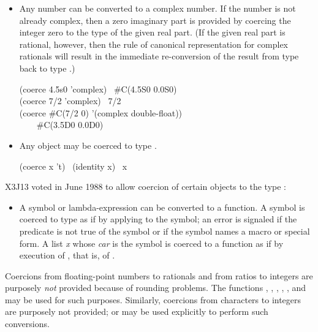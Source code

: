 \begin{defun}[Function]
\begin{itemize}
\item
Any number can be converted to a complex number.
If the number is not already complex, then a zero imaginary part
is provided by coercing the integer zero to the type of the given real part.
(If the given real part is rational, however, then the rule of
canonical representation for complex rationals will result
in the immediate re-conversion of the result from type 
back to type .)
\begin{lisp}
(coerce 4.5s0 'complex) \EV\ \#C(4.5S0 0.0S0) \\
(coerce 7/2 'complex) \EV\ 7/2 \\
(coerce \#C(7/2 0) '(complex double-float)) \\
~~~\EV\ \#C(3.5D0 0.0D0)
\end{lisp}

\item
Any object may be coerced to type .
\begin{lisp}
(coerce x 't) \EQ\ (identity x) \EQ\ x
\end{lisp}
\end{itemize}

\begin{newer}
X3J13 voted in June 1988 
to allow coercion of certain objects to the type :
\begin{itemize}
\item
A symbol or lambda-expression can be converted to a function.
A symbol is coerced to type  as if by applying
 to the symbol; an error is signaled if the predicate
 is not true of
the symbol or if the symbol names a macro or special form.
A list {\it x} whose {\it car} is the symbol 
is coerced to a function as if by execution of ,
that is, of .
\end{itemize}
\end{newer}

Coercions from floating-point numbers to rationals and from ratios
to integers are purposely {\it not} provided because of rounding
problems.  The functions , ,
, , , and  may be used for
such purposes.  Similarly, coercions from characters to integers
are purposely not provided;  or  may be
used explicitly to perform such conversions.
\end{defun}

